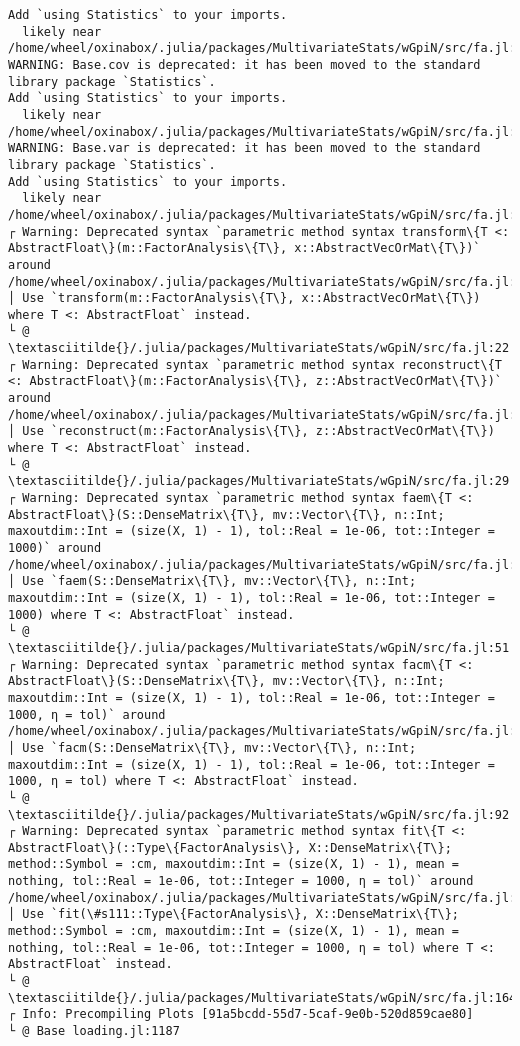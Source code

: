 \documentclass[11pt]{article}
\begin{document}
\begin{Verbatim}[commandchars=\\\{\}]
Add `using Statistics` to your imports.
  likely near /home/wheel/oxinabox/.julia/packages/MultivariateStats/wGpiN/src/fa.jl:13
WARNING: Base.cov is deprecated: it has been moved to the standard library package `Statistics`.
Add `using Statistics` to your imports.
  likely near /home/wheel/oxinabox/.julia/packages/MultivariateStats/wGpiN/src/fa.jl:15
WARNING: Base.var is deprecated: it has been moved to the standard library package `Statistics`.
Add `using Statistics` to your imports.
  likely near /home/wheel/oxinabox/.julia/packages/MultivariateStats/wGpiN/src/fa.jl:16
┌ Warning: Deprecated syntax `parametric method syntax transform\{T <: AbstractFloat\}(m::FactorAnalysis\{T\}, x::AbstractVecOrMat\{T\})` around /home/wheel/oxinabox/.julia/packages/MultivariateStats/wGpiN/src/fa.jl:22.
│ Use `transform(m::FactorAnalysis\{T\}, x::AbstractVecOrMat\{T\}) where T <: AbstractFloat` instead.
└ @ \textasciitilde{}/.julia/packages/MultivariateStats/wGpiN/src/fa.jl:22
┌ Warning: Deprecated syntax `parametric method syntax reconstruct\{T <: AbstractFloat\}(m::FactorAnalysis\{T\}, z::AbstractVecOrMat\{T\})` around /home/wheel/oxinabox/.julia/packages/MultivariateStats/wGpiN/src/fa.jl:29.
│ Use `reconstruct(m::FactorAnalysis\{T\}, z::AbstractVecOrMat\{T\}) where T <: AbstractFloat` instead.
└ @ \textasciitilde{}/.julia/packages/MultivariateStats/wGpiN/src/fa.jl:29
┌ Warning: Deprecated syntax `parametric method syntax faem\{T <: AbstractFloat\}(S::DenseMatrix\{T\}, mv::Vector\{T\}, n::Int; maxoutdim::Int = (size(X, 1) - 1), tol::Real = 1e-06, tot::Integer = 1000)` around /home/wheel/oxinabox/.julia/packages/MultivariateStats/wGpiN/src/fa.jl:51.
│ Use `faem(S::DenseMatrix\{T\}, mv::Vector\{T\}, n::Int; maxoutdim::Int = (size(X, 1) - 1), tol::Real = 1e-06, tot::Integer = 1000) where T <: AbstractFloat` instead.
└ @ \textasciitilde{}/.julia/packages/MultivariateStats/wGpiN/src/fa.jl:51
┌ Warning: Deprecated syntax `parametric method syntax facm\{T <: AbstractFloat\}(S::DenseMatrix\{T\}, mv::Vector\{T\}, n::Int; maxoutdim::Int = (size(X, 1) - 1), tol::Real = 1e-06, tot::Integer = 1000, η = tol)` around /home/wheel/oxinabox/.julia/packages/MultivariateStats/wGpiN/src/fa.jl:92.
│ Use `facm(S::DenseMatrix\{T\}, mv::Vector\{T\}, n::Int; maxoutdim::Int = (size(X, 1) - 1), tol::Real = 1e-06, tot::Integer = 1000, η = tol) where T <: AbstractFloat` instead.
└ @ \textasciitilde{}/.julia/packages/MultivariateStats/wGpiN/src/fa.jl:92
┌ Warning: Deprecated syntax `parametric method syntax fit\{T <: AbstractFloat\}(::Type\{FactorAnalysis\}, X::DenseMatrix\{T\}; method::Symbol = :cm, maxoutdim::Int = (size(X, 1) - 1), mean = nothing, tol::Real = 1e-06, tot::Integer = 1000, η = tol)` around /home/wheel/oxinabox/.julia/packages/MultivariateStats/wGpiN/src/fa.jl:164.
│ Use `fit(\#s111::Type\{FactorAnalysis\}, X::DenseMatrix\{T\}; method::Symbol = :cm, maxoutdim::Int = (size(X, 1) - 1), mean = nothing, tol::Real = 1e-06, tot::Integer = 1000, η = tol) where T <: AbstractFloat` instead.
└ @ \textasciitilde{}/.julia/packages/MultivariateStats/wGpiN/src/fa.jl:164
┌ Info: Precompiling Plots [91a5bcdd-55d7-5caf-9e0b-520d859cae80]
└ @ Base loading.jl:1187

    \end{Verbatim}
\end{document}
